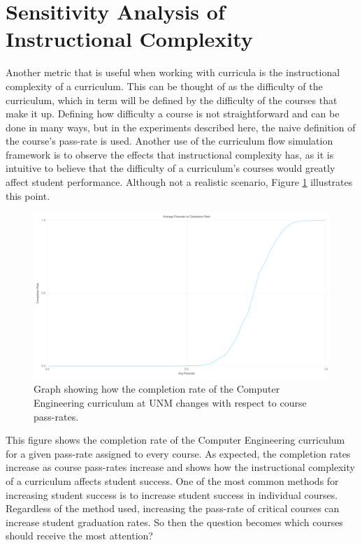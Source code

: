 \documentclass[botnum, fleqn]{unmeethesis}
\begin{document}
\section{Sensitivity Analysis of Instructional Complexity}

Another metric that is useful when working with curricula is the instructional complexity of a curriculum. This can be thought of as the difficulty of the curriculum, which in term will be defined by the difficulty of the courses that make it up. Defining how difficulty a course is not straightforward and can be done in many ways, but in the experiments described here, the naive definition of the course's pass-rate is used. Another use of the curriculum flow simulation framework is to observe the effects that instructional complexity has, as it is intuitive to believe that the difficulty of a curriculum's courses would greatly affect student performance. Although not a realistic scenario, Figure \ref{fig:instructional} illustrates this point.

\begin{figure}[h!]
\centerline{\includegraphics[scale=0.2]{./figures/instructional.png}}
\caption{Graph showing how the completion rate of the Computer Engineering curriculum at UNM changes with respect to course pass-rates.} 
\label{fig:instructional}
\end{figure}

This figure shows the completion rate of the Computer Engineering curriculum for a given pass-rate assigned to every course. As expected, the completion rates increase as course pass-rates increase and shows how the instructional complexity of a curriculum affects student success. One of the most common methods for increasing student success is to increase student success in individual courses. Regardless of the method used, increasing the pass-rate of critical courses can increase student graduation rates. So then the question becomes which courses should receive the most attention?
\end{document}
